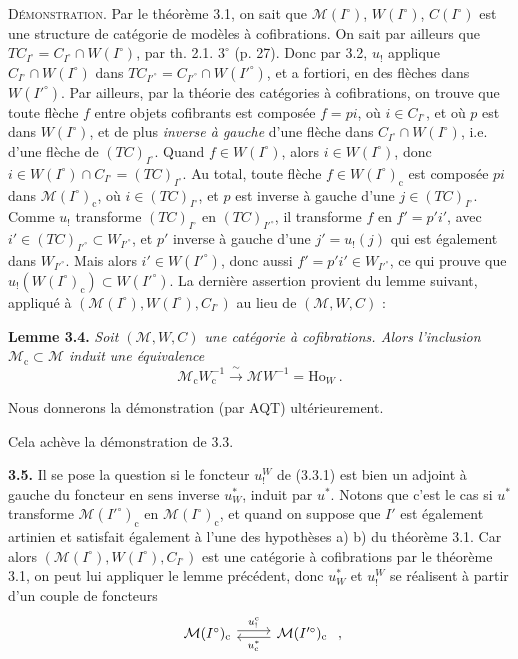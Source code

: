 \documentclass[11pt]{article}
\newcommand{\msp}[1]{\marginpar{\footnotesize [#1]}}
\begin{document}
\textsc{Démonstration}. Par le théorème 3.1, on sait que $\mathcal{M}(I^\circ)$, $W(I^\circ)$, $C(I^\circ)$ est une structure de catégorie de modèles à cofibrations. On sait par ailleurs que $TC_{I^\circ}=C_{I^\circ}\cap W(I^\circ)$, par th. 2.1. $3^\circ$ (p. 27). Donc par 3.2, $u_!$ applique $C_{I^\circ}\cap W(I^\circ)$ dans $TC_{I'^\circ}=C_{I'^\circ}\cap W(I'^\circ)$, et a fortiori, en des flèches dans $W(I'^\circ)$. Par ailleurs, par la théorie des catégories à cofibrations, on trouve que toute flèche $f$ entre objets cofibrants est composée $f=pi$, où $i\in C_{I^\circ}$, et où $p$ est dans $W(I^\circ)$, et de plus \textit{inverse à gauche} d'une flèche dans $C_{I^\circ}\cap W(I^\circ)$, i.e. d'une flèche de $(TC)_{I^\circ}$. Quand
\msp{56}
$f\in W(I^\circ)$, alors $i\in W(I^\circ)$, donc $i\in W(I^\circ)\cap C_{I^\circ}=(TC)_{I^\circ}$. Au total, toute flèche $f\in W(I^\circ)_{\mathrm{c}}$ est composée $pi$ dans $\mathcal{M}(I^\circ)_{\mathrm{c}}$, où $i\in(TC)_{I^\circ}$, et $p$ est inverse à gauche d'une $j\in(TC)_{I^\circ}$. Comme $u_!$ transforme $(TC)_{I^\circ}$ en $(TC)_{I'^\circ}$, il transforme $f$ en $f'=p'i'$, avec $i'\in(TC)_{I'^\circ}\subset W_{I'^\circ}$, et $p'$ inverse à gauche d'une $j'=u_!(j)$ qui est également dans $W_{I'^\circ}$. Mais alors $i'\in W(I'^\circ)$, donc aussi $f'=p'i'\in W_{I'^\circ}$, ce qui prouve que $u_!(W(I^\circ)_{\mathrm{c}})\subset W(I'^\circ)$. La dernière assertion provient du lemme suivant, appliqué à $(\mathcal{M}(I^\circ),W(I^\circ),C_{I^\circ})$ au lieu de $(\mathcal{M},W,C)$ :

\textbf{Lemme 3.4.} \textit{Soit $(\mathcal{M},W,C)$ une catégorie à cofibrations. Alors l'inclusion $\mathcal{M}_{\mathrm{c}}\subset\mathcal{M}$ induit une équivalence}
\[
\mathcal{M}_{\mathrm{c}}W_{\mathrm{c}}^{-1} \xrightarrow{\ \sim\ } \mathcal{M}W^{-1}=\mathrm{Ho}_W\ .
\]

Nous donnerons la démonstration (par AQT) ultérieurement.

Cela achève la démonstration de 3.3.

\textbf{3.5.} Il se pose la question si le foncteur $u_!^W$ de (3.3.1) est bien un adjoint à gauche
\msp{57}
du foncteur en sens inverse $u^*_W$, induit par $u^*$. Notons que c'est le cas si $u^*$ transforme $\mathcal{M}(I'^\circ)_{\mathrm{c}}$ en $\mathcal{M}(I^\circ)_{\mathrm{c}}$, et quand on suppose que $I'$ est également artinien et satisfait également à l'une des hypothèses a) b) du théorème 3.1. Car alors $(\mathcal{M}(I^\circ),W(I^\circ),C_{I^\circ})$ est une catégorie à cofibrations par le théorème 3.1, on peut lui appliquer le lemme précédent, donc $u^*_W$ et $u_!^W$ se réalisent à partir d'un couple de foncteurs
\[
\begin{tikzcd}
\mathcal{M}(I^\circ)_{\mathrm{c}} \arrow[r, shift left, "u_{!}^{\mathrm{c}}"] & \mathcal{M}(I'^\circ)_{\mathrm{c}} \arrow[l, shift left, "u_{\mathrm{c}}^*"]
\end{tikzcd}\ ,
\]
\end{document}
